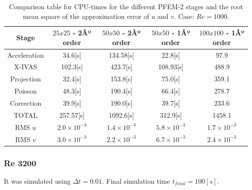 \begin{table}[htbp]
\begin{center}
{\footnotesize
\begin{tabular}[h]{||c|c|c|c|c||}
    \hline
      Stage & $25x25$ - 2Âº order & $50x50$  - 2Âº order & $50x50$ - 1Âº order & $100x100$ - 1Âº order\\
      \hline
      \hline
	Acceleration & 34.6[s]& 134.58[s]& 22.8[s] & 97.9\\
	X-IVAS & 102.3[s]& 423.7[s]& 108.93[s] & 488.9 \\
	Projection & 32.4[s]& 153.8[s]& 75.0[s] & 359.1\\
	Poisson & 48.3[s]& 190.4[s]& 66.4[s] & 278.7\\
	Correction & 39.9[s]& 190.0[s]& 39.7[s] & 233.6\\
      \hline
	TOTAL & 257.57[s]& 1092.6[s]& 312.9[s] & 1458.1\\
      \hline
      \hline
	RMS $u$ & $2.0\times10^{-3}$ & $1.4\times10^{-3}$ & $5.8\times10^{-3}$ & $1.7\times10^{-3}$ \\
	RMS $v$ & $3.0\times10^{-3}$ & $2.2\times10^{-3}$ & $6.7\times10^{-3}$ & $2.4\times10^{-3}$ \\
      \hline
      \hline
\end{tabular}
}
\caption{\label{Tabla:times_Re_1000} Comparison table for CPU-times for the different PFEM-2 stages and the root mean square of the approximation error of $u$ and $v$. Case: $Re=1000$.}
\end{center}
\end{table}

\newpage

\subsubsection{Re 3200}


It was simulated using $\Delta t = 0.01$. Final simulation time $t_{final} = 100[s]$.

